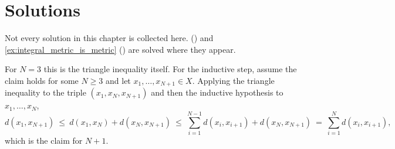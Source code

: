 
\section{Solutions}
\label{sec:metric_spaces_solutions}

Not every solution in this chapter is collected here. 
() and \cref{ex:integral_metric_is_metric}
() are solved where they appear.


\begin{exercisesolution}
\label{sol:polygon_inequality}
For $N=3$ this is the triangle inequality itself. For the inductive step, assume the claim
holds for some $N \geq 3$ and let $x_1,\dots,x_{N+1} \in X$. Applying the triangle inequality to
the triple $(x_1,x_N,x_{N+1})$ and then the inductive hypothesis to $x_1,\dots,x_N$,
\[d(x_1,x_{N+1}) \ \leq\ d(x_1,x_N) + d(x_N,x_{N+1})
  \ \leq\ \sum_{i=1}^{N-1}d(x_i,x_{i+1}) + d(x_N,x_{N+1})
  \ =\ \sum_{i=1}^{N}d(x_i,x_{i+1}),\]
which is the claim for $N+1$.
\end{exercisesolution}

